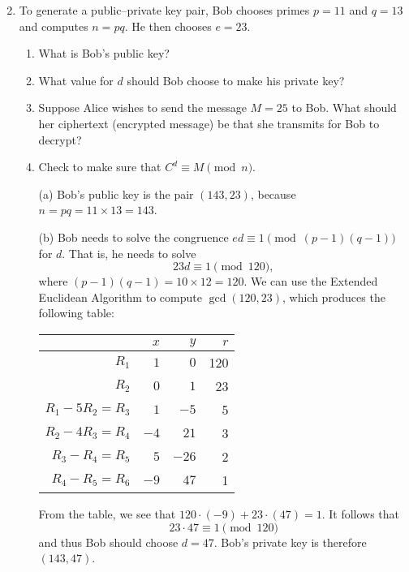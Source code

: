 \documentclass[11pt]{article}
\theoremstyle{plain}
\theoremstyle{definition}
\begin{document}
 \begin{enumerate}\setcounter{enumi}{1}
 \item To generate a public--private key pair, Bob chooses primes $p=11$ and $q=13$ and computes $n=pq$. He then chooses $e=23$.
 \begin{enumerate}
 \item What is Bob's public key?
 \item What value for $d$ should Bob choose to make his private key?
 \item Suppose Alice wishes to send the message $M=25$ to Bob. What should her ciphertext (encrypted message) be that she transmits for Bob to decrypt?
 \item Check to make sure that $C^d\equiv M\pmod{n}$.
\end{enumerate}

\begin{Solution}
\begin{enumerate}
\item[(a)] Bob's public key is the pair $(143,23)$, because $n=pq = 11\times13 = 143$.
\item[(b)] Bob needs to solve the congruence $ed\equiv 1\pmod{(p-1)(q-1)}$ for $d$. That is, he needs to solve
\[
 23d\equiv 1\pmod{120},
\]
where $(p-1)(q-1)=10\times12=120$. We can use the Extended Euclidean Algorithm to compute $\gcd(120,23)$, which produces the following table:
\begin{center}
\begin{tabular}{|r|r|r|r|}
\hline
 & $x$ & $y$ & $r$\\\hline
 $R_1$             &   $1$ &   $0$ & 120\\
 $R_2$             &   $0$ &   $1$ &  23\\
 $R_1 -5R_2 = R_3$ &   $1$ &  $-5$ &   5\\
 $R_2 -4R_3 = R_4$ &  $-4$ &  $21$ &   3\\
 $R_3 - R_4 = R_5$ &   $5$ & $-26$ &   2\\
 $R_4 - R_5 = R_6$ &  $-9$ &  $47$ &   1\\\hline
\end{tabular}
\end{center}
From the table, we see that $120\cdot(-9) + 23\cdot(47) = 1$. It follows that 
\[
 23\cdot 47 \equiv 1 \pmod{120}
\]
and thus Bob should choose $d=47$. Bob's private key is therefore $(143,47)$.


\end{enumerate}
\end{Solution}
\end{enumerate}
\end{document}
